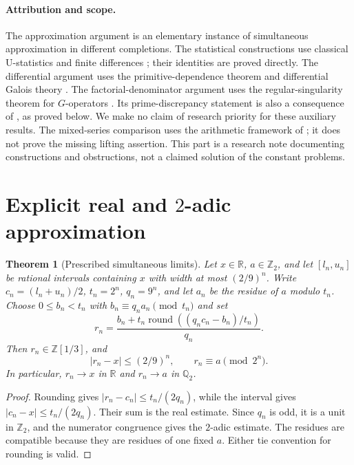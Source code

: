 \documentclass[11pt,a4paper]{article}
\newcommand{\Q}{\mathbb Q}
\newcommand{\R}{\mathbb R}
\newcommand{\Z}{\mathbb Z}
\newtheorem{theorem}{Theorem}[section]
\theoremstyle{definition}
\theoremstyle{remark}
\numberwithin{equation}{section}
\begin{document}
\paragraph{Attribution and scope.}
The approximation argument is an elementary instance of simultaneous
approximation in different completions. The statistical constructions use
classical U-statistics and finite differences \cite{at:Hoeffding1948}; their
identities are proved directly. The differential argument uses the
primitive-dependence theorem and differential Galois theory
\cite{at:Srinivasan2008,at:Katz1982}. The factorial-denominator argument uses the
regular-singularity theorem for $G$-operators \cite{pm:FischlerRivoal2016}.
Its prime-discrepancy statement is also a consequence of
\cite[Theorem 1]{at:Ernvall2018}, as proved below. We make no claim of research
priority for these auxiliary results. The mixed-series comparison uses
the arithmetic framework of \cite{pm:FischlerRivoal2024}; it does not prove
the missing lifting assertion. This part is a research note documenting
constructions and obstructions, not a claimed solution of the constant
problems.

\section{Explicit real and \texorpdfstring{$2$}{2}-adic approximation}
\label{at:sec:approximation}

\begin{theorem}[Prescribed simultaneous limits]
\label{at:app:construction}
Let $x\in\R$, $a\in\Z_2$, and let $[l_n,u_n]$ be rational intervals
containing $x$ with width at most $(2/9)^n$. Write $c_n=(l_n+u_n)/2$,
$t_n=2^n$, $q_n=9^n$, and let $a_n$ be the residue of $a$ modulo $t_n$.
Choose $0\le b_n<t_n$ with $b_n\equiv q_na_n\pmod{t_n}$ and set
\begin{equation}
 r_n=\frac{b_n+t_n\operatorname{round}((q_nc_n-b_n)/t_n)}{q_n}.
 \label{at:eq:rounding}
\end{equation}
Then $r_n\in\Z[1/3]$, and
\begin{equation}
 |r_n-x|\le(2/9)^n,\qquad r_n\equiv a\pmod{2^n}.
 \label{at:eq:rounding-bounds}
\end{equation}
In particular, $r_n\to x$ in $\R$ and $r_n\to a$ in $\Q_2$.
\end{theorem}
\begin{proof}
Rounding gives $|r_n-c_n|\le t_n/(2q_n)$, while the interval gives
$|c_n-x|\le t_n/(2q_n)$. Their sum is the real estimate. Since $q_n$
is odd, it is a unit in $\Z_2$, and the numerator congruence gives the
$2$-adic estimate. The residues are compatible because they are residues
of one fixed $a$. Either tie convention for rounding is valid.
\end{proof}
\end{document}

